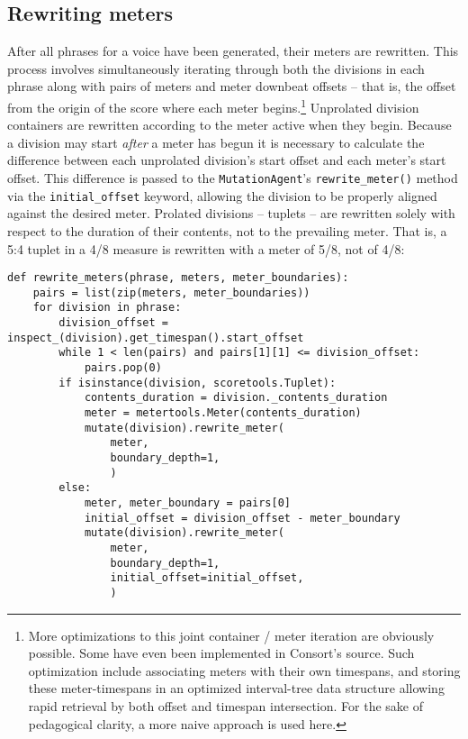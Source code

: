 \subsection{Rewriting meters}
\label{ssec:rewriting-meters}

After all phrases for a voice have been generated, their meters are rewritten.
This process involves simultaneously iterating through both the divisions in
each phrase along with pairs of meters and meter downbeat offsets -- that is,
the offset from the origin of the score where each meter begins.\footnote{More
optimizations to this joint container / meter iteration are obviously possible.
Some have even been implemented in Consort's source. Such optimization include
associating meters with their own timespans, and storing these meter-timespans
in an optimized interval-tree data structure allowing rapid retrieval by both
offset and timespan intersection. For the sake of pedagogical clarity, a more
naive approach is used here.} Unprolated division containers are rewritten
according to the meter active when they begin. Because a division may start
\emph{after} a meter has begun it is necessary to calculate the difference
between each unprolated division's start offset and each meter's start offset.
This difference is passed to the \texttt{MutationAgent}'s
\texttt{rewrite\_meter()} method via the \texttt{initial\_offset} keyword,
allowing the division to be properly aligned against the desired meter.
Prolated divisions -- tuplets -- are rewritten solely with respect to the
duration of their contents, not to the prevailing meter. That is, a 5:4 tuplet
in a 4/8 measure is rewritten with a meter of 5/8, not of 4/8:

\begin{comment}
<abjadextract dissertation.py.time_tools:rewrite_meters />[strip_prompt]
\end{comment}

\begin{abjadbookoutput}
\begin{singlespacing}
\vspace{-0.5\baselineskip}
\begin{verbatim}
def rewrite_meters(phrase, meters, meter_boundaries):
    pairs = list(zip(meters, meter_boundaries))
    for division in phrase:
        division_offset = inspect_(division).get_timespan().start_offset
        while 1 < len(pairs) and pairs[1][1] <= division_offset:
            pairs.pop(0)
        if isinstance(division, scoretools.Tuplet):
            contents_duration = division._contents_duration
            meter = metertools.Meter(contents_duration)
            mutate(division).rewrite_meter(
                meter,
                boundary_depth=1,
                )
        else:
            meter, meter_boundary = pairs[0]
            initial_offset = division_offset - meter_boundary
            mutate(division).rewrite_meter(
                meter,
                boundary_depth=1,
                initial_offset=initial_offset,
                )
\end{verbatim}
\end{singlespacing}
\end{abjadbookoutput}

